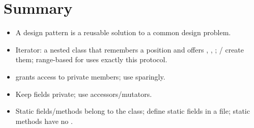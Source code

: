 \section*{Summary}
\begin{itemize}
  \item A design pattern is a reusable solution to a common design problem.
  \item Iterator: a nested class that remembers a position and offers
        \code{*}, \code{++}, \code{!=}; / create
        them; range-based for uses exactly this protocol.
  \item {} grants access to private members; use sparingly.
  \item Keep fields private; use accessors/mutators.
  \item Static fields/methods belong to the class; define static fields in a
         file; static methods have no .
\end{itemize}
